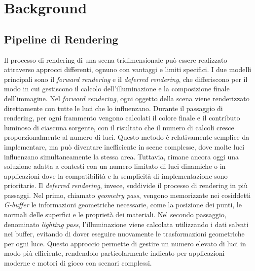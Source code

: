 \documentclass[12pt,a4paper,openright,twoside]{book}
\begin{document}
\chapter{Background}
\label{chap:background}

\section{Pipeline di Rendering}
Il processo di rendering di una scena tridimensionale può essere realizzato attraverso approcci differenti,
ognuno con vantaggi e limiti specifici. I due modelli principali sono il \emph{forward rendering} e il
\emph{deferred rendering}, che differiscono per il modo in cui gestiscono il calcolo dell’illuminazione e la
composizione finale dell’immagine.
Nel \emph{forward rendering}, ogni oggetto della scena viene renderizzato direttamente con tutte le luci che lo influenzano.
Durante il passaggio di rendering, per ogni frammento vengono calcolati il colore finale e il contributo luminoso
di ciascuna sorgente, con il risultato che il numero di calcoli cresce proporzionalmente al numero di luci.
Questo metodo è relativamente semplice da implementare, ma può diventare inefficiente in scene complesse, dove molte
luci influenzano simultaneamente la stessa area. Tuttavia, rimane ancora oggi una soluzione adatta a contesti con un
numero limitato di luci dinamiche o in applicazioni dove la compatibilità e la semplicità di implementazione sono prioritarie.
Il \emph{deferred rendering}, invece, suddivide il processo di rendering in più passaggi. Nel primo, chiamato
\emph{geometry pass}, vengono memorizzate nei cosiddetti \emph{G-buffer} le informazioni geometriche necessarie,
come la posizione dei punti, le normali delle superfici e le proprietà dei materiali. Nel secondo passaggio,
denominato \emph{lighting pass}, l’illuminazione viene calcolata utilizzando i dati salvati nei buffer,
evitando di dover eseguire nuovamente le trasformazioni geometriche per ogni luce. Questo approccio permette di gestire
un numero elevato di luci in modo più efficiente, rendendolo particolarmente indicato per applicazioni moderne e motori
di gioco con scenari complessi.
\end{document}
